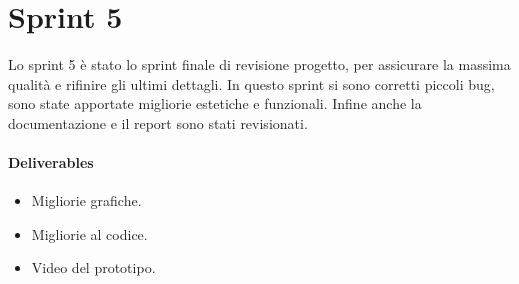 \section{Sprint 5}
Lo sprint 5 è stato lo sprint finale di revisione progetto, per assicurare la massima qualità e rifinire gli ultimi dettagli.
In questo sprint si sono corretti piccoli bug, sono state apportate migliorie estetiche e funzionali. Infine anche la documentazione e il report sono stati revisionati.
\paragraph{Deliverables}
\begin{itemize}
    \item Migliorie grafiche.
    \item Migliorie al codice.
    \item Video del prototipo. 
\end{itemize}


